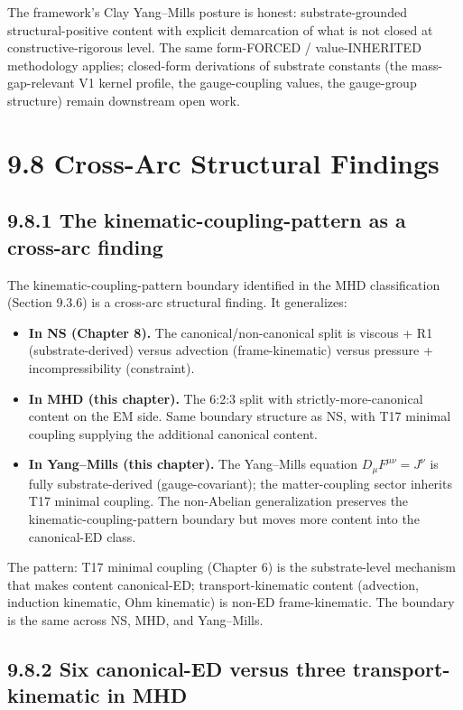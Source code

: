 \documentclass[11pt]{book}
\begin{document}
The framework's Clay Yang–Mills posture is honest: substrate-grounded structural-positive content with explicit demarcation of what is not closed at constructive-rigorous level. The same form-FORCED / value-INHERITED methodology applies; closed-form derivations of substrate constants (the mass-gap-relevant V1 kernel profile, the gauge-coupling values, the gauge-group structure) remain downstream open work.

\section{9.8 Cross-Arc Structural Findings}

\subsection{9.8.1 The kinematic-coupling-pattern as a cross-arc finding}

The kinematic-coupling-pattern boundary identified in the MHD classification (Section 9.3.6) is a cross-arc structural finding. It generalizes:

\begin{itemize}
\item \textbf{In NS (Chapter 8).} The canonical/non-canonical split is viscous + R1 (substrate-derived) versus advection (frame-kinematic) versus pressure + incompressibility (constraint).
\item \textbf{In MHD (this chapter).} The 6:2:3 split with strictly-more-canonical content on the EM side. Same boundary structure as NS, with T17 minimal coupling supplying the additional canonical content.
\item \textbf{In Yang–Mills (this chapter).} The Yang–Mills equation $D_\mu F^{\mu\nu} = J^\nu$ is fully substrate-derived (gauge-covariant); the matter-coupling sector inherits T17 minimal coupling. The non-Abelian generalization preserves the kinematic-coupling-pattern boundary but moves more content into the canonical-ED class.
\end{itemize}

The pattern: T17 minimal coupling (Chapter 6) is the substrate-level mechanism that makes content canonical-ED; transport-kinematic content (advection, induction kinematic, Ohm kinematic) is non-ED frame-kinematic. The boundary is the same across NS, MHD, and Yang–Mills.

\subsection{9.8.2 Six canonical-ED versus three transport-kinematic in MHD}
\end{document}
